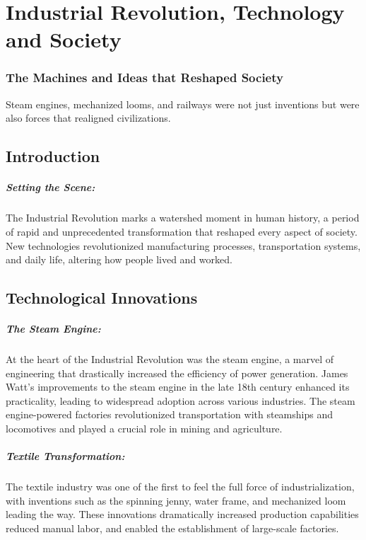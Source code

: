 \documentclass{book}
\begin{document}
\chapter{Industrial Revolution, Technology and Society}
\subsection*{The Machines and Ideas that Reshaped Society}
Steam engines, mechanized looms, and railways were not just inventions but were also forces that realigned civilizations. 

\section*{Introduction}

\paragraph{Setting the Scene:}
The Industrial Revolution marks a watershed moment in human history, a period of rapid and unprecedented transformation that reshaped every aspect of society. New technologies revolutionized manufacturing processes, transportation systems, and daily life, altering how people lived and worked. 

\section*{Technological Innovations}

\paragraph{The Steam Engine:}
At the heart of the Industrial Revolution was the steam engine, a marvel of engineering that drastically increased the efficiency of power generation. James Watt's improvements to the steam engine in the late 18th century enhanced its practicality, leading to widespread adoption across various industries. The steam engine-powered factories revolutionized transportation with steamships and locomotives and played a crucial role in mining and agriculture. 

\paragraph{Textile Transformation:}
The textile industry was one of the first to feel the full force of industrialization, with inventions such as the spinning jenny, water frame, and mechanized loom leading the way. These innovations dramatically increased production capabilities reduced manual labor, and enabled the establishment of large-scale factories. 
\end{document}
